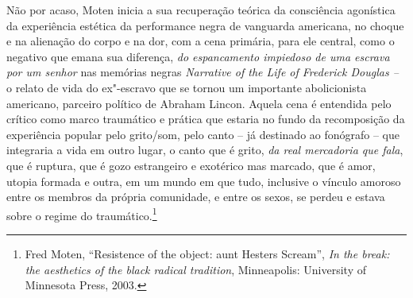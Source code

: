 Não por acaso, Moten inicia a sua recuperação teórica da consciência
agonística da experiência estética da performance negra de vanguarda
americana, no choque e na alienação do corpo e na dor, com a cena
primária, para ele central, como o negativo que emana sua diferença,
\emph{do espancamento impiedoso de uma escrava por um senhor} nas
memórias negras \emph{Narrative of the Life of Frederick Douglas --} o
relato de vida do ex"-escravo que se tornou um importante abolicionista
americano, parceiro político de Abraham Lincon. Aquela cena é
entendida pelo crítico como marco traumático e prática que estaria no
fundo da recomposição da experiência popular pelo grito/som, pelo canto
-- já destinado ao fonógrafo -- que integraria a vida em outro lugar, o
canto que é grito, \emph{da real mercadoria que fala}, que é ruptura,
que é gozo estrangeiro e exotérico mas marcado, que é amor, utopia
formada e outra, em um mundo em que tudo, inclusive o vínculo amoroso
entre os membros da própria comunidade, e entre os sexos, se perdeu e
estava sobre o regime do traumático.\footnote{Fred Moten, ``Resistence of
  the object: aunt Hesters Scream'', \emph{In the break: the aesthetics
  of the black radical tradition}, Minneapolis: University of Minnesota
  Press, 2003.}

